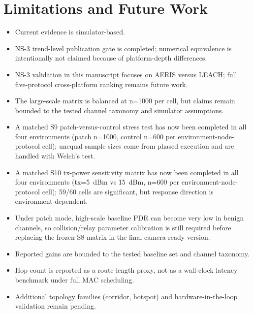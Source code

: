 \documentclass[sensors,article,submit,moreauthors,pdftex]{Definitions/mdpi}
\begin{document}
\section{Limitations and Future Work}
\begin{itemize}
\item Current evidence is simulator-based.
\item NS-3 trend-level publication gate is completed; numerical equivalence is intentionally not claimed because of platform-depth differences.
\item NS-3 validation in this manuscript focuses on AERIS versus LEACH; full five-protocol cross-platform ranking remains future work.
\item The large-scale matrix is balanced at n=1000 per cell, but claims remain bounded to the tested channel taxonomy and simulator assumptions.
\item A matched S9 patch-versus-control stress test has now been completed in all four environments (patch n=1000, control n=600 per environment-node-protocol cell); unequal sample sizes come from phased execution and are handled with Welch's test.
\item A matched S10 tx-power sensitivity matrix has now been completed in all four environments (tx=\SI{5}{dBm} vs \SI{15}{dBm}, n=600 per environment-node-protocol cell); 59/60 cells are significant, but response direction is environment-dependent.
\item Under patch mode, high-scale baseline PDR can become very low in benign channels, so collision/relay parameter calibration is still required before replacing the frozen S8 matrix in the final camera-ready version.
\item Reported gains are bounded to the tested baseline set and channel taxonomy.
\item Hop count is reported as a route-length proxy, not as a wall-clock latency benchmark under full MAC scheduling.
\item Additional topology families (corridor, hotspot) and hardware-in-the-loop validation remain pending.
\end{itemize}
\end{document}
